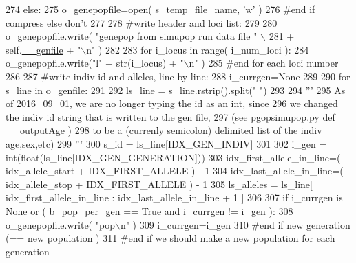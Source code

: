 \begin{DoxyCode}
274         \textcolor{keywordflow}{else}:
275             o\_genepopfile=open( s\_temp\_file\_name, \textcolor{stringliteral}{'w'} )
276         \textcolor{comment}{#end if compress else don't}
277 
278         \textcolor{comment}{#write header and loci list:}
279 
280         o\_genepopfile.write( \textcolor{stringliteral}{"genepop from simupop run data file "} \(\backslash\)
281                 + self.\hyperlink{classnegui_1_1pgoutputsimupop_1_1PGOutputSimuPop_a30fb6b94af13efad6becfbe6fddc1d95}{\_\_genfile} + \textcolor{stringliteral}{"\(\backslash\)n"} )
282 
283         \textcolor{keywordflow}{for} i\_locus \textcolor{keywordflow}{in} range( i\_num\_loci ):
284             o\_genepopfile.write(\textcolor{stringliteral}{"l"} + str(i\_locus) + \textcolor{stringliteral}{"\(\backslash\)n"} )
285         \textcolor{comment}{#end for each loci number}
286 
287         \textcolor{comment}{#write indiv id and alleles, line by line:}
288         i\_currgen=\textcolor{keywordtype}{None}
289 
290         \textcolor{keywordflow}{for} s\_line \textcolor{keywordflow}{in} o\_genfile:
291             
292             ls\_line = s\_line.rstrip().split(\textcolor{stringliteral}{" "})
293 
294             \textcolor{stringliteral}{'''}
295 \textcolor{stringliteral}{            As of 2016\_09\_01, we are no longer typing the id as an int, since}
296 \textcolor{stringliteral}{            we changed the indiv id string that is written to the gen file,}
297 \textcolor{stringliteral}{            (see pgopsimupop.py def \_\_outputAge )}
298 \textcolor{stringliteral}{            to be a (currenly semicolon) delimited list of the indiv age,sex,etc)}
299 \textcolor{stringliteral}{            '''}
300             s\_id = ls\_line[IDX\_GEN\_INDIV]
301 
302             i\_gen = int(float(ls\_line[IDX\_GEN\_GENERATION]))
303             idx\_first\_allele\_in\_line=( idx\_allele\_start + IDX\_FIRST\_ALLELE ) - 1
304             idx\_last\_allele\_in\_line=( idx\_allele\_stop  + IDX\_FIRST\_ALLELE ) - 1 
305             ls\_alleles = ls\_line[ idx\_first\_allele\_in\_line : idx\_last\_allele\_in\_line + 1 ]
306 
307             \textcolor{keywordflow}{if} i\_currgen \textcolor{keywordflow}{is} \textcolor{keywordtype}{None} \textcolor{keywordflow}{or} ( b\_pop\_per\_gen == \textcolor{keyword}{True} \textcolor{keywordflow}{and} i\_currgen != i\_gen ):
308                     o\_genepopfile.write( \textcolor{stringliteral}{"pop\(\backslash\)n"} )
309                     i\_currgen=i\_gen
310                 \textcolor{comment}{#end if new generation (== new population )}
311                 \textcolor{comment}{#end if we should make a new population for each generation}

\end{DoxyCode}
